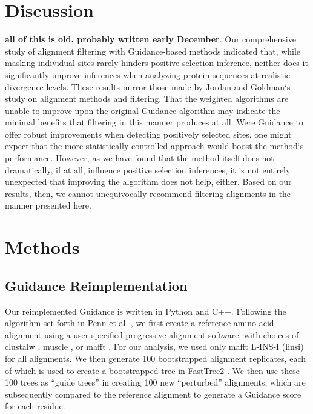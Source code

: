 \documentclass[10pt]{article}
\begin{document}
\section*{Discussion}

\textbf{all of this is old, probably written early December}.
Our comprehensive study of alignment filtering with Guidance-based methods indicated that, while masking individual sites rarely hinders positive selection inference, neither does it significantly improve inferences when analyzing protein sequences at realistic divergence levels. These results mirror those made by Jordan and Goldman`s \citep{Jordan2011} study on alignment methods and filtering. That the weighted algorithms are unable to improve upon the original Guidance algorithm may indicate the minimal benefits that filtering in this manner produces at all. Were Guidance to offer robust improvements when detecting positively selected sites, one might expect that the more statistically controlled approach would boost the method`s performance. However, as we have found that the method itself does not dramatically, if at all, influence positive selection inferences, it is not entirely unexpected that improving the algorithm does not help, either. Based on our results, then, we cannot unequivocally recommend filtering alignments in the manner presented here. 

\section*{Methods}

\subsection*{Guidance Reimplementation}
Our reimplemented Guidance is written in Python and C++. Following the algorithm set forth in Penn et al. \citep{Penn2010}, we first create a reference amino-acid alignment using a user-specified progressive alignment software, with choices of clustalw \citep{Thompson1994}, muscle \citep{Edgar2004}, or mafft \citep{Katoh2002, Katoh2005}. For our analysis, we used only mafft L-INS-I (linsi) for all alignments. We then generate 100 bootstrapped alignment replicates, each of which is used to create a bootstrapped tree in FastTree2 \citep{Price2010}. We then use these 100 trees as “guide trees” in creating 100 new “perturbed” alignments, which are subsequently compared to the reference alignment to generate a Guidance score for each residue.
\end{document}
